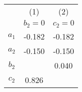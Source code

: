 \begin{tabular}{ccc}
    \toprule
    & (1) & (2) \\
    & $b_2 = 0$ & $c_2 = 0$ \\
    \midrule
    $a_1$ & -0.182 & -0.182 \\
    $a_2$ & -0.150 & -0.150 \\
    $b_2$ && 0.040 \\
    $c_2$ & 0.826 \\
    \bottomrule
\end{tabular}
